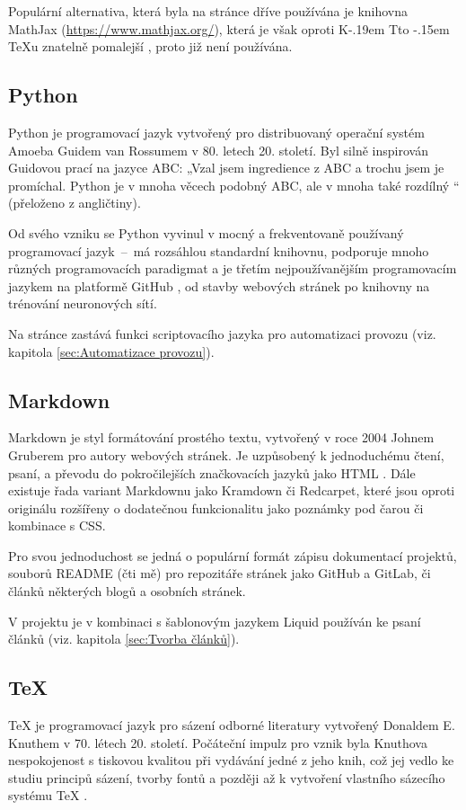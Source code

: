 \documentclass[a4paper, 12pt]{article}
\makeatletter
\DeclareRobustCommand{\KaTeX}{%
  K\kern -.19em
  {\sbox \z@ T\vbox to\ht \z@ {\hbox{%
  \check@mathfonts
  \fontsize\sf@size\z@
  \selectfont A}%
  \vss}%
}\kern -.15em
\TeX}
\makeatother
\begin{document}
  Populární alternativa, která byla na stránce dříve používána je knihovna MathJax (\url{https://www.mathjax.org/}), která je však oproti \KaTeX u znatelně pomalejší \cite{katex-mathjax-comparison}, proto již není používána.


  \subsection{Python} \label{sec:Python}
  Python je programovací jazyk vytvořený pro distribuovaný operační systém Amoeba Guidem van Rossumem v 80. letech 20. století. Byl silně inspirován Guidovou prací na jazyce ABC: „Vzal jsem ingredience z ABC a trochu jsem je promíchal. Python je v mnoha věcech podobný ABC, ale v mnoha také rozdílný \cite{making-of-python}“ (přeloženo z angličtiny).

  Od svého vzniku se Python vyvinul v mocný a frekventovaně používaný programovací jazyk~--~má rozsáhlou standardní knihovnu, podporuje mnoho různých programovacích paradigmat a je třetím nejpoužívanějším programovacím jazykem na platformě GitHub \cite{github-statistics}, od stavby webových stránek po knihovny na trénování neuronových sítí.

  Na stránce zastává funkci scriptovacího jazyka pro automatizaci provozu (viz. kapitola \ref{sec:Automatizace provozu}).


  \subsection{Markdown} \label{sec:Markdown}
  Markdown je styl formátování prostého textu, vytvořený v roce 2004 Johnem Gruberem pro autory webových stránek. Je uzpůsobený k jednoduchému čtení, psaní, a převodu do pokročilejších značkovacích jazyků jako HTML \cite{markdown-history}. Dále existuje řada variant Markdownu jako Kramdown či Redcarpet, které jsou oproti originálu rozšířeny o dodatečnou funkcionalitu jako poznámky pod čarou či kombinace s CSS.

  Pro svou jednoduchost se jedná o populární formát zápisu dokumentací projektů, souborů README (čti mě) pro repozitáře stránek jako GitHub a GitLab, či článků některých blogů a osobních stránek.

  V projektu je v kombinaci s šablonovým jazykem Liquid používán ke psaní článků (viz. kapitola \ref{sec:Tvorba článků}).


  \subsection{\TeX} \label{sec:TeX}
  \TeX{} je programovací jazyk pro sázení odborné literatury vytvořený Donaldem E. Knuthem v 70. létech 20. století. Počáteční impulz pro vznik byla Knuthova nespokojenost s tiskovou kvalitou při vydávání jedné z jeho knih, což jej vedlo ke studiu principů sázení, tvorby fontů a později až k vytvoření vlastního sázecího systému \TeX{} \cite{tex-history}.
\end{document}
